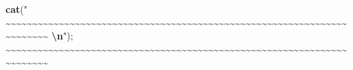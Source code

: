 \documentclass[
]{article}
\newenvironment{Shaded}{\begin{snugshade}}{\end{snugshade}}
\newcommand{\ErrorTok}[1]{\textcolor[rgb]{0.64,0.00,0.00}{\textbf{#1}}}
\newcommand{\FunctionTok}[1]{\textcolor[rgb]{0.13,0.29,0.53}{\textbf{#1}}}
\newcommand{\NormalTok}[1]{#1}
\newcommand{\SpecialCharTok}[1]{\textcolor[rgb]{0.81,0.36,0.00}{\textbf{#1}}}
\newcommand{\StringTok}[1]{\textcolor[rgb]{0.31,0.60,0.02}{#1}}
\begin{document}
\begin{Shaded}
\begin{Highlighting}[]
\FunctionTok{cat}\NormalTok{(}\StringTok{"    \textasciitilde{}\textasciitilde{}\textasciitilde{}\textasciitilde{}\textasciitilde{}\textasciitilde{}\textasciitilde{}\textasciitilde{}\textasciitilde{}\textasciitilde{}\textasciitilde{}\textasciitilde{}\textasciitilde{}\textasciitilde{}\textasciitilde{}\textasciitilde{}\textasciitilde{}\textasciitilde{}\textasciitilde{}\textasciitilde{}\textasciitilde{}\textasciitilde{}\textasciitilde{}\textasciitilde{}\textasciitilde{}\textasciitilde{}\textasciitilde{}\textasciitilde{}\textasciitilde{}\textasciitilde{}\textasciitilde{}\textasciitilde{}\textasciitilde{}\textasciitilde{}\textasciitilde{}\textasciitilde{}\textasciitilde{}\textasciitilde{}\textasciitilde{}\textasciitilde{}\textasciitilde{}\textasciitilde{}\textasciitilde{}\textasciitilde{}\textasciitilde{}\textasciitilde{}\textasciitilde{}\textasciitilde{}\textasciitilde{}\textasciitilde{}\textasciitilde{}\textasciitilde{}\textasciitilde{}\textasciitilde{}\textasciitilde{}\textasciitilde{}\textasciitilde{}\textasciitilde{}\textasciitilde{}\textasciitilde{}\textasciitilde{}\textasciitilde{}\textasciitilde{}\textasciitilde{}\textasciitilde{}\textasciitilde{}\textasciitilde{}\textasciitilde{}\textasciitilde{}\textasciitilde{}\textasciitilde{}\textasciitilde{}    }\SpecialCharTok{\textbackslash{}n}\StringTok{"}\NormalTok{); }
    \SpecialCharTok{\textasciitilde{}}\ErrorTok{\textasciitilde{}\textasciitilde{}\textasciitilde{}\textasciitilde{}\textasciitilde{}\textasciitilde{}\textasciitilde{}\textasciitilde{}\textasciitilde{}\textasciitilde{}\textasciitilde{}\textasciitilde{}\textasciitilde{}\textasciitilde{}\textasciitilde{}\textasciitilde{}\textasciitilde{}\textasciitilde{}\textasciitilde{}\textasciitilde{}\textasciitilde{}\textasciitilde{}\textasciitilde{}\textasciitilde{}\textasciitilde{}\textasciitilde{}\textasciitilde{}\textasciitilde{}\textasciitilde{}\textasciitilde{}\textasciitilde{}\textasciitilde{}\textasciitilde{}\textasciitilde{}\textasciitilde{}\textasciitilde{}\textasciitilde{}\textasciitilde{}\textasciitilde{}\textasciitilde{}\textasciitilde{}\textasciitilde{}\textasciitilde{}\textasciitilde{}\textasciitilde{}\textasciitilde{}\textasciitilde{}\textasciitilde{}\textasciitilde{}\textasciitilde{}\textasciitilde{}\textasciitilde{}\textasciitilde{}\textasciitilde{}\textasciitilde{}\textasciitilde{}\textasciitilde{}\textasciitilde{}\textasciitilde{}\textasciitilde{}\textasciitilde{}\textasciitilde{}\textasciitilde{}\textasciitilde{}\textasciitilde{}\textasciitilde{}\textasciitilde{}\textasciitilde{}\textasciitilde{}\textasciitilde{}\textasciitilde{}}    
\end{Highlighting}
\end{Shaded}
\end{document}
